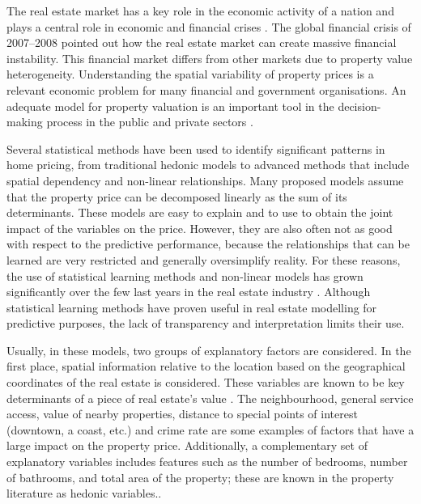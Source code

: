 \documentclass[smallextended,natbib]{svjour3}\usepackage[]{graphicx}\usepackage[]{xcolor}
\begin{document}
The real estate market has a key role in the economic activity of a nation and plays a central role in economic and financial crises \citep{mooya2016standard}. The global financial crisis of 2007--2008 pointed out how the real estate market can create massive financial instability. This financial market differs from other markets due to property value heterogeneity. Understanding the spatial variability of property prices is a relevant economic problem for many financial and government organisations. An adequate model for property valuation is an important tool in the decision-making process in the public and private sectors \citep{osland2010,case2004}. 

Several statistical methods have been used to identify significant patterns in home pricing, from traditional hedonic models \citep{rosen1974} to advanced methods that include spatial dependency and non-linear relationships. Many proposed models assume that the property price can be decomposed linearly as the sum of its determinants. These models are easy to explain and to use to obtain the joint impact of the variables on the price. However, they are also often not as good with respect to the predictive performance, because the relationships that can be learned are very restricted and generally oversimplify reality. For these reasons, the use of statistical learning methods and non-linear models has grown significantly over the few last years in the real estate industry  \citep{limsombunchai2004, yoo2012,  park2015, goyeneche2017}. Although statistical learning methods have proven useful in real estate modelling for predictive purposes, the lack of transparency and interpretation limits their use.

Usually, in these models, two groups of explanatory factors are considered. In the first place, spatial information relative to the location based on the geographical coordinates of the real estate is considered. These variables are known to be key determinants of a piece of real estate's value \citep{kiel2008}. The neighbourhood, general service access, value of nearby properties, distance to special points of interest (downtown, a coast, etc.) and crime rate are some examples of factors that have a large impact on the property price. Additionally, a complementary set of explanatory variables includes features such as the number of bedrooms, number of bathrooms, and total area of the property; these are known in the property literature as hedonic variables.\citep{sirmans2005}. 
\end{document}
